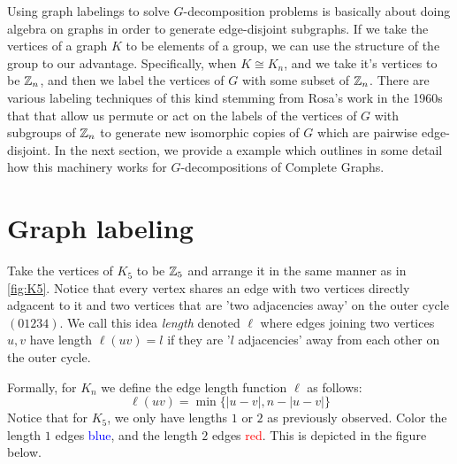 Using graph labelings to solve $G$-decomposition problems is basically about doing algebra on graphs in order to generate edge-disjoint subgraphs. If we take the vertices of a graph $K$ to be elements of a group, we can use the structure of the group to our advantage. Specifically, when $K\cong K_{n}$, and we take it's vertices to be $\mathbb{Z}_{n}$, and then we label the vertices of $G$ with some subset of $\mathbb{Z}_{n}$. There are various labeling techniques of this kind stemming from Rosa's work in the 1960s that that allow us permute or act on the labels of the vertices of $G$ with subgroups of $\mathbb{Z}_{n}$ to generate new isomorphic copies of $G$ which are pairwise edge-disjoint. In the next section, we provide a example which outlines in some detail how this machinery works for $G$-decompositions of Complete Graphs.
\section{Graph labeling}

Take the vertices of $K_{5}$ to be $\mathbb{Z}_{5}$ and arrange it in the same manner as in \ref{fig:K5}. Notice that every vertex shares an edge with two vertices directly adgacent to it and two vertices that are 'two adjacencies away' on the outer cycle $(01234)$. We call this idea \textit{length} denoted $\ell$ where edges joining two vertices $u,v$ have length $\ell(uv)=l$ if they are '$l$ adjacencies' away from each other on the outer cycle. 

Formally, for $K_{n}$ we define the edge length function $\ell$ as follows:
$$\ell(uv)=\min\{|u-v|,n-|u-v|\}$$
Notice that for $K_{5}$, we only have lengths $1$ or $2$ as previously observed. Color the length $1$ edges \textcolor{blue}{blue}, and the length $2$ edges \textcolor{red}{red}. This is depicted in the figure below.


